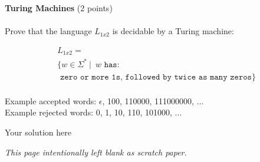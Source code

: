 \documentclass[12pt]{article}
\newenvironment{question}[2][Question]{\begin{trivlist}
\item[\hskip \labelsep {\bfseries #1}\hskip \labelsep {\bfseries #2.}]}{\end{trivlist}}
\newenvironment{solution}[1][Solution:]{\begin{trivlist}
\item[\hskip \labelsep {\bfseries #1}\hskip \labelsep {\bfseries}]\color{blue}}{\end{trivlist}}
\begin{document}
\newpage


\begin{question}{8}\textbf{Turing Machines} (2 points)\\\\
Prove that the language $L_{1x2}$ is decidable by a Turing machine:


    \begin{align*}
        &L_{1x2} = \\
        &\{ w \in \Sigma^* \ \vert \;  \ w  \texttt{ has: } \\
        &\texttt{ zero or more 1s, followed by twice as many zeros}
        \}\\
    \end{align*}

Example accepted words: $\epsilon$, 100, 110000, 111000000, $\dots$ \\
Example rejected words: 0, 1, 10, 110, 101000, $\dots$

     \begin{solution}
       Your solution here
    \end{solution}


\end{question}

\clearpage

\begin{center}
\vspace{-3em}
\textit{This page intentionally left blank as scratch paper.}
\end{center}


 
\end{document}
